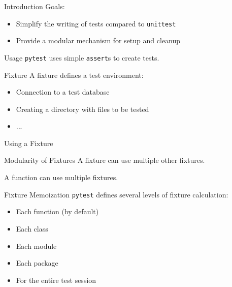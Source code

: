 \begin{frame}{Introduction}
  Goals:
  \begin{itemize}[<+->]
  \item Simplify the writing of tests compared to \texttt{unittest}
  \item Provide a modular mechanism for setup and cleanup
  \end{itemize}
  \end{frame}
  
  \begin{frame}{Usage}
  \texttt{pytest} uses simple \texttt{assert}s to create tests.
  
  \end{frame}
  
  \begin{frame}{Fixture}
  A fixture defines a test environment:
  
  \begin{itemize}[<+->]
  \item Connection to a test database
  \item Creating a directory with files to be tested
  \item ...
  \end{itemize}
  \end{frame}
  
  \begin{frame}{Using a Fixture}
  \end{frame}
  
  \begin{frame}{Modularity of Fixtures}
  A fixture can use multiple other fixtures.
  
  A function can use multiple fixtures.
  \end{frame}
  
  \begin{frame}{Fixture Memoization}
  \texttt{pytest} defines several levels of fixture calculation:
  
  \begin{itemize}[<+->]
  \item Each function (by default)
  \item Each class
  \item Each module
  \item Each package
  \item For the entire test session
  \end{itemize}
  \end{frame}
  
